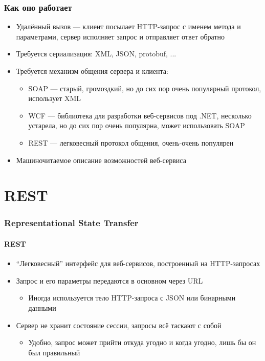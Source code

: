 \documentclass{../../slides-style}
\begin{document}
    \begin{frame}
        \frametitle{Как оно работает}
        \begin{itemize}
            \item Удалённый вызов --- клиент посылает HTTP-запрос с именем метода и параметрами, сервер исполняет запрос и отправляет ответ обратно
            \item Требуется сериализация: XML, JSON, protobuf, ...
            \item Требуется механизм общения сервера и клиента:
            \begin{itemize}
                \item SOAP --- старый, громоздкий, но до сих пор очень популярный протокол, использует XML
                \item WCF --- библиотека для разработки веб-сервисов под .NET, несколько устарела, но до сих пор очень популярна, может использовать SOAP
                \item REST --- легковесный протокол общения, очень-очень популярен
            \end{itemize}
            \item Машиночитаемое описание возможностей веб-сервиса
        \end{itemize}
    \end{frame}

    \section{REST}

    \begin{frame}
        \frametitle{Representational State Transfer}
        \framesubtitle{REST}
        \begin{itemize}
            \item \enquote{Легковесный} интерфейс для веб-сервисов, построенный на HTTP-запросах
            \item Запрос и его параметры передаются в основном через URL
            \begin{itemize}
                \item Иногда используется тело HTTP-запроса с JSON или бинарными данными
            \end{itemize}
            \item Сервер не хранит состояние сессии, запросы всё таскают с собой
            \begin{itemize}
                \item Удобно, запрос может прийти откуда угодно и когда угодно, лишь бы он был правильный
            \end{itemize}
        \end{itemize}
    \end{frame}
\end{document}
